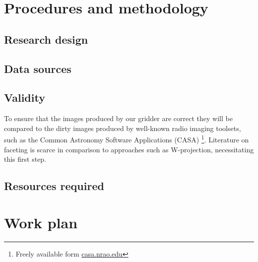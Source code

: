 \documentclass[a4paper,11pt,two column]{article}
\begin{document}
\section{Procedures and methodology}
\subsection{Research design}
\subsection{Data sources}
\subsection{Validity}
 To ensure that the images produced by our gridder are correct they will be compared to the dirty images produced by well-known radio imaging toolsets, such as the Common Astronomy Software 
 Applications (CASA) \footnote{Freely available form \url{casa.nrao.edu}}.
 Literature on faceting is scarce in comparison to approaches such as W-projection, necessitating this first step.
\subsection{Resources required}
 
\section{Work plan}


\end{document}
